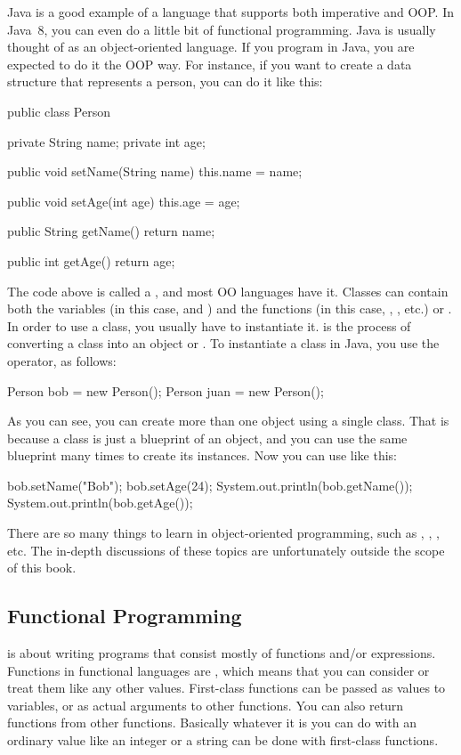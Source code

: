 Java is a good example of a language that supports both imperative and OOP. In Java~8, you can even do a little bit of functional programming. Java is usually thought of as an object-oriented language. If you program in Java, you are expected to do it the OOP way. For instance, if you want to create a data structure that represents a person, you can do it like this:
\begin{Java}
	public class Person {
		private String name;
		private int age;
		
		public void setName(String name) {
			this.name = name;		
		}
		
		public void setAge(int age) {
			this.age = age;		
		}
		
		public String getName() {
			return name;		
		}
		
		public int getAge() {
			return age;		
		}
	}
\end{Java}
The code above is called a , and most OO languages have it. Classes can contain both the variables (in this case,  and ) and the functions (in this case, , , etc.) or . In order to use a class, you usually have to instantiate it.  is the process of converting a class into an object or . To instantiate a class in Java, you use the  operator, as follows:
\begin{Java}[3]
	Person bob = new Person();
	Person juan = new Person();
\end{Java}
As you can see, you can create more than one object using a single class. That is because a class is just a blueprint of an object, and you can use the same blueprint many times to create its instances. Now you can use  like this:
\begin{Java}[5]
	bob.setName("Bob");
	bob.setAge(24);
	System.out.println(bob.getName());
	System.out.println(bob.getAge());
\end{Java}

There are so many things to learn in object-oriented programming, such as , , , etc. The in-depth discussions of these topics are unfortunately outside the scope of this book.

\subsection{Functional Programming}
 is about writing programs that consist mostly of functions and/or expressions. Functions in functional languages are , which means that you can consider or treat them like any other values. First-class functions can be passed as values to variables, or as actual arguments to other functions. You can also return functions from other functions. Basically whatever it is you can do with an ordinary value like an integer  or a string  can be done with first-class functions.

